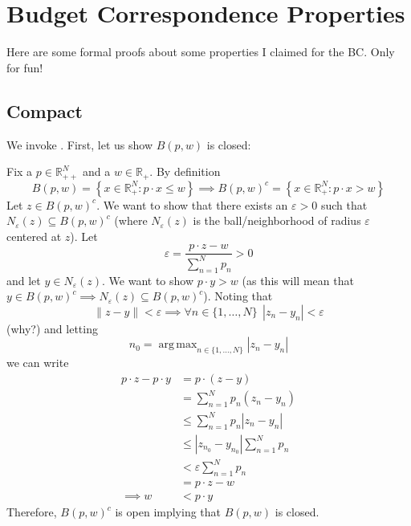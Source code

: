 \documentclass{article}
\newcommand{\R}{\mathbb{R}}
\DeclareMathOperator*{\argmax}{arg\,max}
\theoremstyle{mythm}
\theoremstyle{mydef}
\begin{document}
\section{Budget Correspondence Properties}
\label{sub:appendix_budget_correspondence_properties}
Here are some formal proofs about some properties I claimed for the BC. Only for fun!

\subsection{Compact}
\label{ssub:appendix_compact}

We invoke . First, let us show $B(p, w)$ is closed:

Fix a $p\in \R^N_{++}$ and a $w \in \R_+$. By definition
\begin{equation*}
    B(p,w) = \left\{ x\in\R_+^N : p\cdot x \leq w \right\} \implies B(p,w)^c = \left\{ x \in \R_+^N : p\cdot x > w \right\}
\end{equation*}
Let $z \in B(p,w)^c$. We want to show that there exists an $\varepsilon > 0$ such that $N_\varepsilon(z) \subseteq B(p,w)^c$ (where $N_\varepsilon(z)$ is the ball/neighborhood of radius $\varepsilon$ centered at $z$). Let
\begin{equation*}
    \varepsilon = \frac{p\cdot z - w}{\sum_{n=1}^N p_n} > 0
\end{equation*}
and let $y\in N_\varepsilon(z)$. We want to show $p\cdot y > w$ (as this will mean that $y\in B(p,w)^c \implies N_\varepsilon(z) \subseteq B(p,w)^c$). Noting that 
\begin{equation*}
    \lVert z - y \rVert < \varepsilon \implies \forall n\in\{1,\hdots,N\} ~~ |z_n - y_n| < \varepsilon
\end{equation*}
(why?) and letting 
\begin{equation*}
    n_0 = \argmax_{n\in\{1,\hdots,N\}} |z_{n} - y_{n} | 
\end{equation*}
we can write 
\begin{align*}
    p\cdot z - p \cdot y &= p\cdot(z-y) \\
    &= \sum_{n=1}^N p_n (z_n - y_n) \\
    &\leq \sum_{n=1}^N p_n |z_n - y_n| \\
    &\leq |z_{n_0} - y_{n_0} | \sum_{n=1}^N p_n \\
    &< \varepsilon \sum_{n=1}^N p_n \\
    &= p\cdot z - w\\
    \implies w &< p\cdot y
\end{align*}
Therefore, $B(p,w)^c$ is open implying that $B(p,w)$ is closed. 
\end{document}
